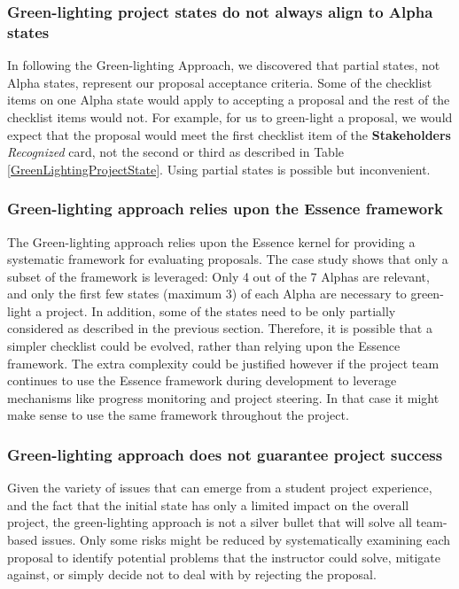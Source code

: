 \documentclass[conference]{IEEEtran}
\begin{document}
\subsubsection{Green-lighting project states do not always
align to Alpha states}

In following the Green-lighting Approach, we discovered that partial
states, not Alpha states, represent our proposal acceptance criteria.
Some of the checklist items on one Alpha state would apply to accepting
a proposal and the rest of the checklist items would not. For example, 
for us to green-light a proposal, we would expect that the
proposal would meet the first checklist item of the
 \textbf{Stakeholders} \textit{Recognized} card, not the second or third as
described in Table \ref{GreenLightingProjectState}. 
Using partial states is possible but inconvenient. 

\subsubsection{Green-lighting approach relies upon the Essence framework}
The Green-lighting approach relies upon the Essence kernel for providing 
a systematic framework for evaluating proposals. The case study shows that  
only a subset of the framework is leveraged: Only 4 out of the 7 Alphas are 
relevant, and only the first few states (maximum 3) of each Alpha are necessary 
to green-light a project. In addition, some of the states need to be only partially 
considered as described in the previous section. Therefore, it is possible that a simpler checklist 
could be evolved, rather than relying upon the Essence framework. The extra 
complexity could be justified however if the project team continues to use 
the Essence framework during development to leverage mechanisms like progress 
monitoring and project steering. In that case it might make sense to use the 
same framework throughout the project.

\subsubsection{Green-lighting approach does not guarantee project success}
Given the variety of issues that can emerge from a student project experience, and the fact that the initial state has only a limited impact on the overall project, the green-lighting approach is not a silver bullet that will solve all team-based issues.
Only some risks might be reduced by systematically examining each proposal to identify
potential problems that the instructor could solve, mitigate against, 
or simply decide not to deal with by rejecting the proposal.
\end{document}
